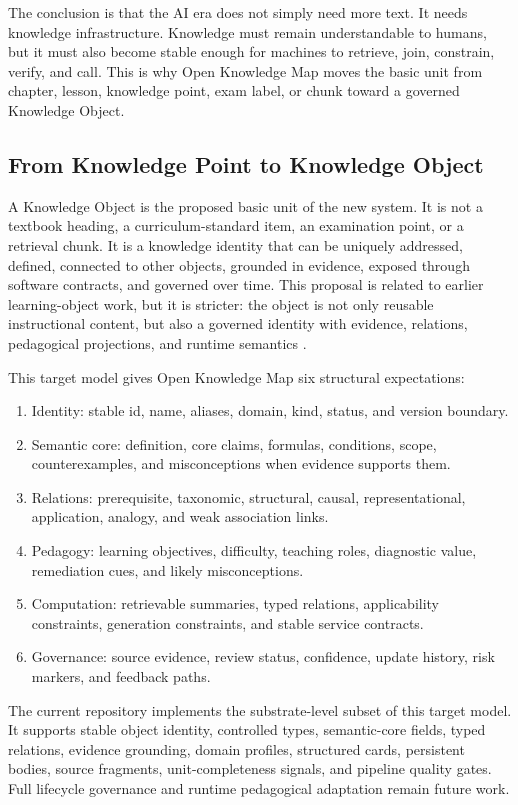\documentclass[11pt,letterpaper]{article}
\newcommand{\OKM}{Open Knowledge Map}
\begin{document}
The conclusion is that the AI era does not simply need more text. It needs knowledge infrastructure. Knowledge must remain understandable to humans, but it must also become stable enough for machines to retrieve, join, constrain, verify, and call. This is why \OKM{} moves the basic unit from chapter, lesson, knowledge point, exam label, or chunk toward a governed Knowledge Object.

\subsection{From Knowledge Point to Knowledge Object}

A Knowledge Object is the proposed basic unit of the new system. It is not a textbook heading, a curriculum-standard item, an examination point, or a retrieval chunk. It is a knowledge identity that can be uniquely addressed, defined, connected to other objects, grounded in evidence, exposed through software contracts, and governed over time. This proposal is related to earlier learning-object work, but it is stricter: the object is not only reusable instructional content, but also a governed identity with evidence, relations, pedagogical projections, and runtime semantics \cite{wiley-learning-objects,koedinger-kli}.

This target model gives \OKM{} six structural expectations:

\begin{enumerate}
  \item Identity: stable id, name, aliases, domain, kind, status, and version boundary.
  \item Semantic core: definition, core claims, formulas, conditions, scope, counterexamples, and misconceptions when evidence supports them.
  \item Relations: prerequisite, taxonomic, structural, causal, representational, application, analogy, and weak association links.
  \item Pedagogy: learning objectives, difficulty, teaching roles, diagnostic value, remediation cues, and likely misconceptions.
  \item Computation: retrievable summaries, typed relations, applicability constraints, generation constraints, and stable service contracts.
  \item Governance: source evidence, review status, confidence, update history, risk markers, and feedback paths.
\end{enumerate}

The current repository implements the substrate-level subset of this target model. It supports stable object identity, controlled types, semantic-core fields, typed relations, evidence grounding, domain profiles, structured cards, persistent bodies, source fragments, unit-completeness signals, and pipeline quality gates. Full lifecycle governance and runtime pedagogical adaptation remain future work.
\end{document}
